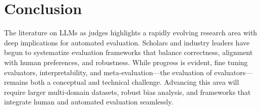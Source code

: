 
\section{Conclusion}
The literature on LLMs as judges highlights a rapidly evolving research area with deep implications for automated evaluation. Scholars and industry leaders have begun to systematize evaluation frameworks that balance correctness, alignment with human preferences, and robustness. While progress is evident, fine tuning evaluators, interpretability, and meta-evaluation—the evaluation of evaluators—remains both a conceptual and technical challenge. Advancing this area will require larger multi-domain datasets, robust bias analysis, and frameworks that integrate human and automated evaluation seamlessly.~\nocite{li2024_llmsasjudges}